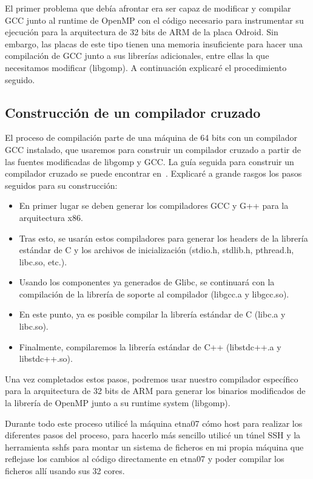 El primer problema que debía afrontar era ser capaz de modificar y compilar GCC junto al runtime de OpenMP con el código necesario para instrumentar su ejecución para la arquitectura de 32 bits de ARM de la placa Odroid. Sin embargo, las placas de este tipo tienen una memoria insuficiente para hacer una compilación de GCC junto a sus librerías adicionales, entre ellas la que necesitamos modificar (libgomp). A continuación explicaré el procedimiento seguido.


\subsection{Construcción de un compilador cruzado}\label{sec:crucomp}

El proceso de compilación parte de una máquina de 64 bits con un compilador GCC instalado, que usaremos para construir un compilador cruzado a partir de las fuentes modificadas de libgomp y GCC. La guía seguida para construir un compilador cruzado se puede encontrar en~\cite{crucomp}. Explicaré a grande rasgos los pasos seguidos para su construcción:

\begin{itemize}
  \item En primer lugar se deben generar los compiladores GCC y G++ para la arquitectura x86.
  \item Tras esto, se usarán estos compiladores para generar los headers de la librería estándar de C y los archivos de inicialización (stdio.h, stdlib.h, pthread.h, libc.so, etc.).
  \item Usando los componentes ya generados de Glibc, se continuará con la compilación de la librería de soporte al compilador (libgcc.a y libgcc.so).
  \item En este punto, ya es posible compilar la librería estándar de C (libc.a y libc.so).
  \item Finalmente, compilaremos la librería estándar de C++ (libstdc++.a y libstdc++.so).
\end{itemize}

Una vez completados estos pasos, podremos usar nuestro compilador específico para la arquitectura de 32 bits de ARM para generar los binarios modificados de la librería de OpenMP junto a su runtime system (libgomp).

Durante todo este proceso utilicé la máquina etna07 cómo host para realizar los diferentes pasos del proceso, para hacerlo más sencillo utilicé un túnel SSH y la herramienta sshfs para montar un sistema de ficheros en mi propia máquina que reflejase los cambios al código directamente en etna07 y poder compilar los ficheros allí usando sus 32 cores.

